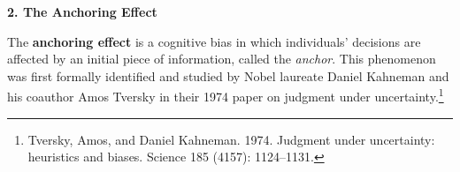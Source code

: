 \documentclass[12pt]{article}
\begin{document}



\begin{center}
    \textbf{\large 2. The Anchoring Effect}    
\end{center}

The \textbf{anchoring effect} is a cognitive bias in which individuals’ decisions are affected by an initial piece of information, called the \emph{anchor}. This phenomenon was first formally identified and studied by Nobel laureate Daniel Kahneman and his coauthor Amos Tversky in their 1974 paper on judgment under uncertainty.\footnote{Tversky, Amos, and Daniel Kahneman. 1974. Judgment under uncertainty: heuristics and biases.
Science 185 (4157): 1124–1131.}
\end{document}
